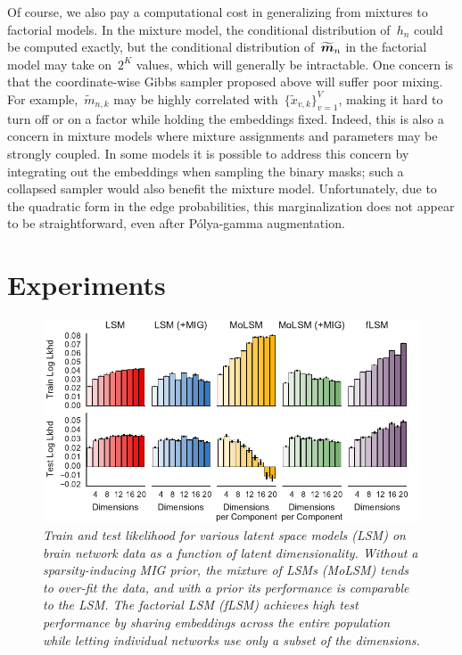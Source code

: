 Of course, we also pay a computational cost in generalizing from
mixtures to factorial models.  In the mixture model, the conditional
distribution of~$h_n$ could be computed exactly, but the conditional
distribution of~$\widetilde{\boldsymbol{m}}_n$ in the factorial model may take
on~$2^K$ values, which will generally be intractable.  One concern is
that the coordinate-wise Gibbs sampler proposed above will suffer poor
mixing. For example,~$\widetilde{m}_{n,k}$ may be highly correlated
with~$\{\widetilde{x}_{v,k}\}_{v=1}^V$, making it hard to turn off or
on a factor while holding the embeddings fixed. Indeed, this is also a
concern in mixture models where mixture assignments and parameters may
be strongly coupled. In some models it is possible to address this
concern by integrating out the embeddings when sampling the binary
masks; such a collapsed sampler would also benefit the mixture model.
Unfortunately, due to the quadratic form in the edge probabilities,
this marginalization does not appear to be straightforward, even after
P\'{o}lya-gamma augmentation.

\section{Experiments}



\begin{figure}[t]
\includegraphics[width=\linewidth]{figures/lls.pdf}
\caption{\textit{Train and test likelihood for various
    latent space models (LSM) on brain network data as a function of
    latent dimensionality. Without a sparsity-inducing MIG prior,
    the mixture of LSMs (MoLSM) tends to over-fit the data, and with a prior its
    performance is comparable to the LSM.  The factorial LSM (fLSM)
    achieves high test performance by sharing embeddings across the
    entire population while letting individual networks use only a subset
    of the dimensions.}}
\label{fig:lls}
\end{figure}


